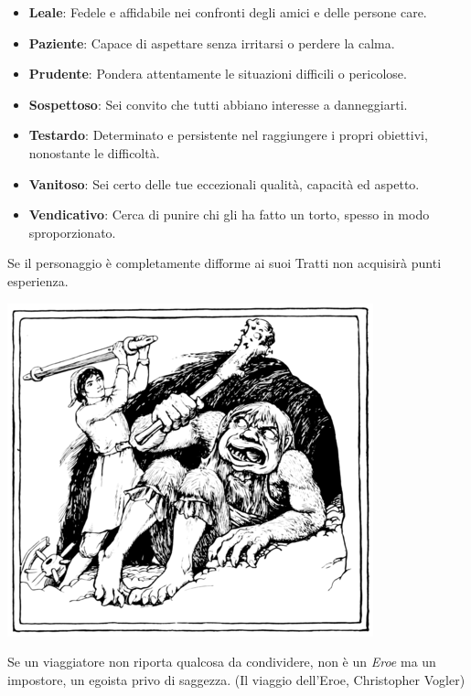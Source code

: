 \begin{multicols}{2}
\begin{itemize}[leftmargin=*]
	\item \textbf{Leale}: Fedele e affidabile nei confronti degli amici e delle persone care.
	\item \textbf{Paziente}: Capace di aspettare senza irritarsi o perdere la calma.
	\item \textbf{Prudente}: Pondera attentamente le situazioni difficili o pericolose.
	\item \textbf{Sospettoso}: Sei convito che tutti abbiano interesse a danneggiarti.
	\item \textbf{Testardo}: Determinato e persistente nel raggiungere i propri obiettivi, nonostante le difficoltà.
	\item \textbf{Vanitoso}: Sei certo delle tue eccezionali qualità, capacità ed aspetto.
	\item \textbf{Vendicativo}: Cerca di punire chi gli ha fatto un torto, spesso in modo sproporzionato.

\end{itemize}

\end{multicols}


\smallskip

Se il personaggio è completamente difforme ai suoi Tratti non acquisirà punti esperienza.

\vfill

\begin{center}
\includegraphics[height=0.4\linewidth]{immagini/troll.png}
\end{center}

\medskip

\begin{changemargin}{0.3cm}{0.3cm}\begin{enfasi}{Se un viaggiatore non riporta qualcosa da condividere, non è un \emph{Eroe} ma un impostore, un egoista privo di saggezza. (Il viaggio dell'Eroe, Christopher Vogler)}\end{enfasi}\end{changemargin}

\pagebreak

